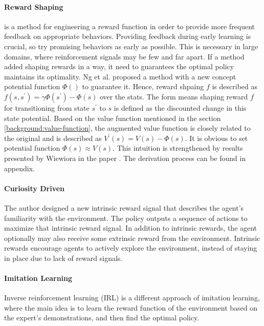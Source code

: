 \paragraph{Reward Shaping\parencite{Wiewiora2010}} is a method for engineering a reward function in order to provide more frequent feedback on appropriate behaviors. Providing feedback during early learning is crucial, so try promising behaviors as early as possible. This is necessary in large domains, where reinforcement signals may be few and far apart. If a method added shaping rewards in a way, it need to guarantees the optimal policy maintains its optimality. Ng et al. proposed a method with a new concept potential function $\Phi()$ to guarantee it. Hence, reward shpaing $f$ is described as $f(s, s^{\prime}) = \gamma\Phi(s^{\prime}) - \Phi(s)$ over the stats\parencite{Ng1999PolicyIU}. The form means shaping reward $f$ for transitioning from state $s^{\prime}$ to $s$ is defined as the discounted change in this state potential. Based on the value function mentioned in the section \ref{background:value-function}, the augmented value function is closely related to the original and is described as $V^{\prime}(s) = V(s) - \Phi(s)$. It is obvious to set potential function $\Phi(s) \approx V(s)$. This intuition is strengthened by results presented by Wiewiora in the paper \parencite{Wiewiora2003}. The derivation process can be found in appendix.

 
\paragraph{Curiosity Driven \parencite{pathakICMl17curiosity}} The author designed a new intrinsic reward signal that describes the agent’s familiarity with the environment. The policy outputs a sequence of actions to maximize that intrinsic reward signal. In addition to intrinsic rewards, the agent optionally may also receive some extrinsic reward from the environment. Intrinsic rewards encourage agents to actively explore the environment, instead of staying in place due to lack of reward signals.

\paragraph{Imitation Learning\parencite{DBLP:journals/corr/HesterVPLSPSDOA17}} Inverse reinforcement learning (IRL) is a different approach of imitation learning, where the main idea is to learn the reward function of the environment based on the expert’s demonstrations, and then find the optimal policy.

